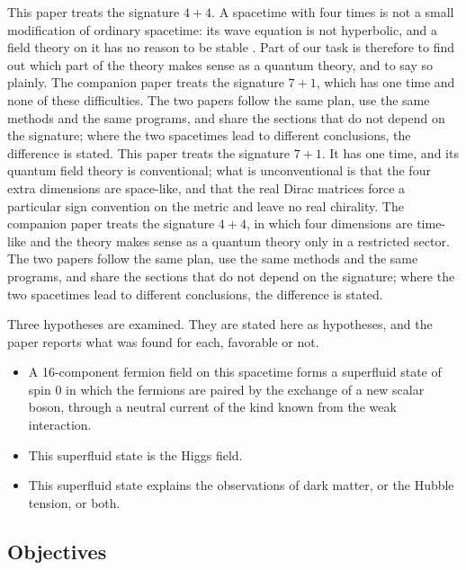 This paper treats the signature $4+4$. A spacetime with four times is not a small modification of
ordinary spacetime: its wave equation is not hyperbolic, and a field theory on it has no reason to be
stable \cite{Tegmark1997,CraigWeinstein2009,Bars2001}. Part of our task is therefore to find out which
part of the theory makes sense as a quantum theory, and to say so plainly. The companion paper
\cite{Companion1671} treats the signature $7+1$, which has one time and none of these difficulties.
The two papers follow the same plan, use the same methods and the same programs, and share the
sections that do not depend on the signature; where the two spacetimes lead to different conclusions,
the difference is stated.
This paper treats the signature $7+1$. It has one time, and its quantum field theory is conventional;
what is unconventional is that the four extra dimensions are space-like, and that the real Dirac
matrices force a particular sign convention on the metric and leave no real chirality. The companion
paper \cite{Companion1644} treats the signature $4+4$, in which four dimensions are time-like and the
theory makes sense as a quantum theory only in a restricted sector. The two papers follow the same
plan, use the same methods and the same programs, and share the sections that do not depend on the
signature; where the two spacetimes lead to different conclusions, the difference is stated.

Three hypotheses are examined. They are stated here as hypotheses, and the paper reports what was found
for each, favorable or not.
\begin{itemize}
\item[H1.] A 16-component fermion field on this spacetime forms a superfluid state of spin 0 in which
the fermions are paired by the exchange of a new scalar boson, through a neutral current of the kind
known from the weak interaction.
\item[H2.] This superfluid state is the Higgs field.
\item[H3.] This superfluid state explains the observations of dark matter, or the Hubble tension, or
both.
\end{itemize}

\subsection{Objectives}
\label{sec:objectives}

